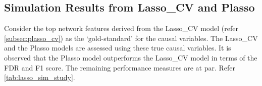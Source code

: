 \subsection{Simulation Results from Lasso\_CV and Plasso} \label{subsec:simstudy_plasso}
Consider the top network features derived from the Lasso\_CV model (refer \autoref{subsec:plasso_cv}) as the \lq gold-standard' for the causal variables. The Lasso\_CV and the Plasso models are assessed using these true causal variables. It is observed that the Plasso model outperforms the Lasso\_CV model in terms of the FDR and F1 score. The remaining performance measures are at par. Refer \autoref{tab:lasso_sim_study}.\\ 
\begin{table}[H]
\caption{Performance measures of Lasso\_CV and Plasso models.}
\label{tab:lasso_sim_study}
\end{table}

